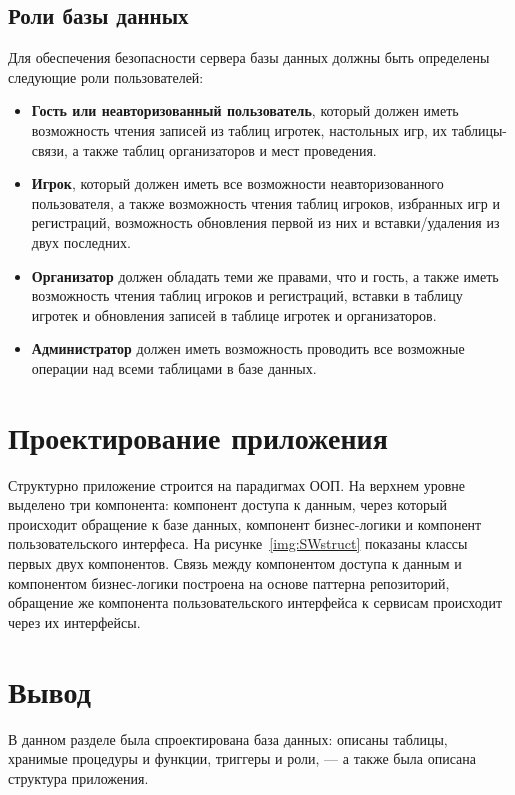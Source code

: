 
\subsection{Роли базы данных}

Для обеспечения безопасности сервера базы данных должны быть определены
следующие роли пользователей:

\begin{itemize}
    \item \textbf{Гость или неавторизованный пользователь}, который должен иметь
        возможность чтения записей из таблиц игротек, настольных игр, их
        таблицы-связи, а также таблиц организаторов и мест проведения.
    \item \textbf{Игрок}, который должен иметь все возможности неавторизованного
        пользователя, а также возможность чтения таблиц игроков, избранных игр и
        регистраций, возможность обновления первой из них и вставки/удаления из
        двух последних.
    \item \textbf{Организатор} должен обладать теми же правами, что и гость, а
        также иметь возможность чтения таблиц игроков и регистраций, вставки в
        таблицу игротек и обновления записей в таблице игротек и организаторов.
    \item \textbf{Администратор} должен иметь возможность проводить все
        возможные операции над всеми таблицами в базе данных.
\end{itemize}

\section{Проектирование приложения}

Структурно приложение строится на парадигмах ООП. На верхнем уровне выделено три
компонента: компонент доступа к данным, через который происходит обращение к
базе данных, компонент бизнес-логики и компонент пользовательского интерфеса.
На рисунке~\ref{img:SWstruct} показаны классы первых двух компонентов.
Связь между компонентом доступа к данным и компонентом бизнес-логики построена
на основе паттерна репозиторий, обращение же компонента пользовательского
интерфейса к сервисам происходит через их интерфейсы.

\section*{Вывод}

В данном разделе была спроектирована база данных: описаны таблицы, хранимые
процедуры и функции, триггеры и роли, --- а также была описана структура
приложения.

\clearpage
{}
~\\
~\\
~\\
